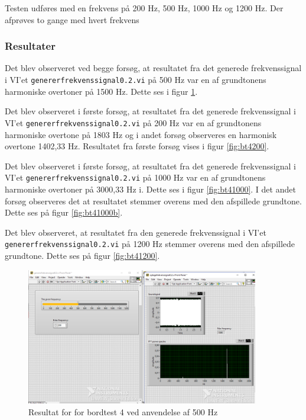 {			
			Testen udføres med en frekvens på 200 Hz, 500 Hz, 1000 Hz og 1200 Hz. Der afprøves to gange med hvert frekvens  
			
			\subsubsection{Resultater}
			Det blev observeret ved begge forsøg, at resultatet fra det generede frekvenssignal i VI'et \texttt{genererfrekvenssignal0.2.vi} på 500 Hz var en af grundtonens harmoniske overtoner på 1500 Hz. Dette ses i figur \ref{fig:bt4500}. 

			 Det blev observeret i første forsøg, at resultatet fra det generede frekvenssignal i VI'et \texttt{genererfrekvenssignal0.2.vi} på 200 Hz var en af grundtonens harmoniske overtone på 1803 Hz og i andet forsøg observeres en harmonisk overtone 1402,33 Hz. Resultatet fra første forsøg vises i figur \ref{fig:bt4200}.
			 
			 Det blev observeret i første forsøg, at resultatet fra det generede frekvenssignal i VI'et \texttt{genererfrekvenssignal0.2.vi} på 1000 Hz var en af grundtonens harmoniske overtoner på 3000,33 Hz i. Dette ses i figur \ref{fig:bt41000}. I det andet forsøg observeres det at resultatet stemmer overens med den afspillede grundtone. Dette ses på figur \ref{fig:bt41000b}.  
			 
			 Det blev observeret, at resultatet fra den generede frekvenssignal i VI'et \texttt{genererfrekvenssignal0.2.vi} på 1200 Hz stemmer overens med den afspillede grundtone. Dette ses på figur \ref{fig:bt41200}.  
			 
			\begin{figure}[htb]
			\centering
				\includegraphics[width=4in]{Bordtest4500Hz}
				\caption{Resultat for for bordtest 4 ved anvendelse af 500 Hz}	
				\label{fig:bt4500}
			\end{figure} 
			
}
